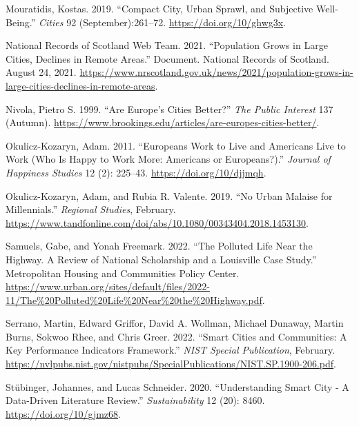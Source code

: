\documentclass[
  english,
  12pt,
  a4paper,
]{scrartcl}
\newlength{\cslhangindent}
\newenvironment{CSLReferences}[2] %
 {\begin{list}{}{%
  \setlength{\itemindent}{0pt}
  \setlength{\leftmargin}{0pt}
  \setlength{\parsep}{0pt}
  \ifodd #1
   \setlength{\leftmargin}{\cslhangindent}
   \setlength{\itemindent}{-1\cslhangindent}
  \fi
  \setlength{\itemsep}{#2\baselineskip}}}
 {\end{list}}
\begin{document}
\begin{CSLReferences}{1}{0}
Mouratidis, Kostas. 2019. {``Compact City, Urban Sprawl, and Subjective
Well-Being.''} \emph{Cities} 92 (September):261--72.
\url{https://doi.org/10/ghwg3x}.

National Records of Scotland Web Team. 2021. {``Population {Grows} in
{Large Cities}, {Declines} in {Remote Areas}.''} Document. National
Records of Scotland. August 24, 2021.
\url{https://www.nrscotland.gov.uk/news/2021/population-grows-in-large-cities-declines-in-remote-areas}.

Nivola, Pietro S. 1999. {``Are {Europe}'s Cities Better?''} \emph{The
Public Interest} 137 (Autumn).
\url{https://www.brookings.edu/articles/are-europes-cities-better/}.

Okulicz-Kozaryn, Adam. 2011. {``Europeans Work to Live and {Americans}
Live to Work ({Who} Is Happy to Work More: {Americans} or
{Europeans}?).''} \emph{Journal of Happiness Studies} 12 (2): 225--43.
\url{https://doi.org/10/djjmqh}.

Okulicz-Kozaryn, Adam, and Rubia R. Valente. 2019. {``No Urban Malaise
for {Millennials}.''} \emph{Regional Studies}, February.
\url{https://www.tandfonline.com/doi/abs/10.1080/00343404.2018.1453130}.

Samuels, Gabe, and Yonah Freemark. 2022. {``The Polluted Life Near the
Highway. {A} Review of National Scholarship and a {Louisville} Case
Study.''} {Metropolitan Housing and Communities Policy Center}.
\url{https://www.urban.org/sites/default/files/2022-11/The\%20Polluted\%20Life\%20Near\%20the\%20Highway.pdf}.

Serrano, Martin, Edward Griffor, David A. Wollman, Michael Dunaway,
Martin Burns, Sokwoo Rhee, and Chris Greer. 2022. {``Smart Cities and
Communities: {A} Key Performance Indicators Framework.''} \emph{NIST
Special Publication}, February.
\url{https://nvlpubs.nist.gov/nistpubs/SpecialPublications/NIST.SP.1900-206.pdf}.

Stübinger, Johannes, and Lucas Schneider. 2020. {``Understanding {Smart
City} - {A} Data-Driven Literature Review.''} \emph{Sustainability} 12
(20): 8460. \url{https://doi.org/10/gjmz68}.


\end{CSLReferences}
\end{document}
